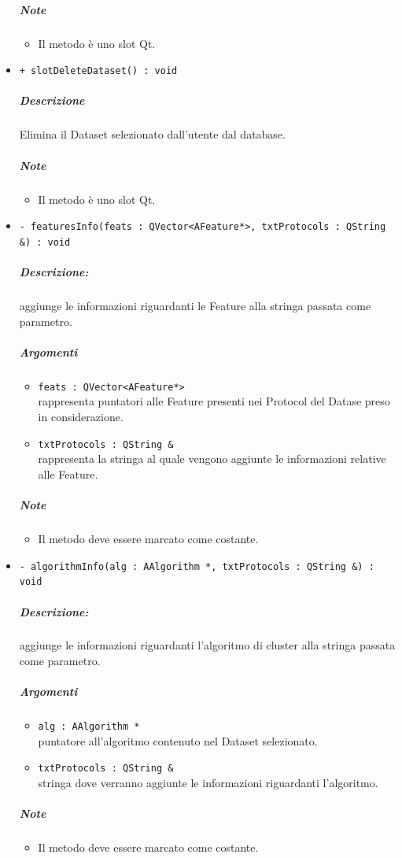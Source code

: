 \begin{itemize}
			\subparagraph{Note}
			\begin{itemize}
				\item Il metodo è uno slot\g{} Qt\g{}.
			\end{itemize}
			\item \color{blue} \verb!+ slotDeleteDataset() : void!
			\color{black}
			\subparagraph{Descrizione} Elimina il Dataset\g{} selezionato dall'utente dal database.
			\subparagraph{Note}
			\begin{itemize}
				\item Il metodo è uno slot\g{} Qt\g{}.
			\end{itemize}
			\item \color{blue} \verb!- featuresInfo(feats : QVector<AFeature*>, txtProtocols : QString &) : void!
			\color{black}
			\subparagraph{Descrizione:} aggiunge le informazioni riguardanti le Feature\g{} alla stringa passata come parametro.
			\color{black}
			\subparagraph{Argomenti}
			\begin{itemize}
				\item \color{RoyalPurple} \verb!feats : QVector<AFeature*>!\\				
\color{black} rappresenta puntatori alle Feature\g{} presenti nei Protocol\g{} del Datase\g{} preso in considerazione.
				\item \color{RoyalPurple} \verb!txtProtocols : QString &!\\				
\color{black} rappresenta la stringa al quale vengono aggiunte le informazioni relative alle Feature\g{}.
			\end{itemize}
			\subparagraph{Note}
			\begin{itemize}
				\item Il metodo deve essere marcato come costante.
			\end{itemize}
			\item \color{blue} \verb!- algorithmInfo(alg : AAlgorithm *, txtProtocols : QString &) : void!
			\color{black}
			\subparagraph{Descrizione:} aggiunge le informazioni riguardanti l'algoritmo di cluster\g{} alla stringa passata come parametro.
			\color{black}
			\subparagraph{Argomenti}
			\begin{itemize}
				\item \color{RoyalPurple} \verb!alg : AAlgorithm *!\\				
\color{black} puntatore all'algoritmo contenuto nel Dataset\g{} selezionato.
				\item \color{RoyalPurple} \verb!txtProtocols : QString &!\\				
\color{black} stringa dove verranno aggiunte le informazioni riguardanti l'algoritmo.
			\end{itemize}
			\subparagraph{Note}
			\begin{itemize}
				\item Il metodo deve essere marcato come costante.
			\end{itemize}
		\end{itemize}
		\pagebreak
